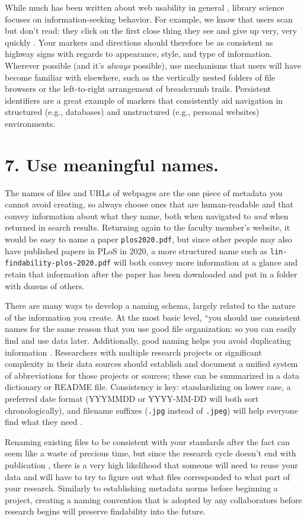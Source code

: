 \documentclass[10pt,letterpaper]{article}
\newcommand{\rulemajor}[1]{\section*{#1}}
\begin{document}
While much has been written about web usability in general
\cite{Covert2014,NNG2020}, library science focuses on information-seeking
behavior.  For example, we know that users scan but don't read: they click on
the first close thing they see and give up very, very quickly
\cite{Bates2002}. Your markers and directions should therefore be as consistent
as highway signs with regards to appearance, style, and type of
information. Wherever possible (and it's \emph{always} possible), use mechanisms
that users will have become familiar with elsewhere, such as the vertically
nested folders of file browsers or the left-to-right arrangement of breadcrumb
trails. Persistent identifiers are a great example of markers that consistently aid navigation in structured (e.g., databases) and unstructured (e.g., personal websites) environments.

\rulemajor{7. Use meaningful names.}

The names of files and URLs of webpages are the one piece of metadata you cannot
avoid creating, so always choose ones that are human-readable and that convey
information about what they name, both when navigated to \emph{and} when
returned in search results. Returning again to the faculty member's website, it
would be easy to name a paper \texttt{plos2020.pdf}, but since other people may
also have published papers in PLoS in 2020, a more structured name such as
\texttt{lin-findability-plos-2020.pdf} will both convey more information at a
glance and retain that information after the paper has been downloaded and put
in a folder with dozens of others.

There are many ways to develop a naming schema, largely related to the nature of
the information you create. At the most basic level, ``you should use consistent
names for the same reason that you use good file organization: so you can easily
find and use data later. Additionally, good naming helps you avoid duplicating
information \cite{Briney2015}. Researchers with multiple research projects or
significant complexity in their data sources should establish and document a
unified system of abbreviations for those projects or sources; these can be
summarized in a data dictionary or README file. Consistency is key:
standardizing on lower case, a preferred date format (YYYMMDD or YYYY-MM-DD will
both sort chronologically), and filename suffixes (\texttt{.jpg} instead of
\texttt{.jpeg}) will help everyone find what they need \cite{Wilson2014,Wilson2017}.

Renaming existing files to be consistent with your standards after the fact can
seem like a waste of precious time, but since the research cycle doesn't end
with publication \cite{Briney2015}, there is a very high likelihood that someone
will need to reuse your data and will have to try to figure out what files
corresponded to what part of your research.
Similarly to establishing metadata norms before beginning a project, creating a naming convention that is adopted by any collaborators before research begins will preserve findability into the future.
\end{document}
